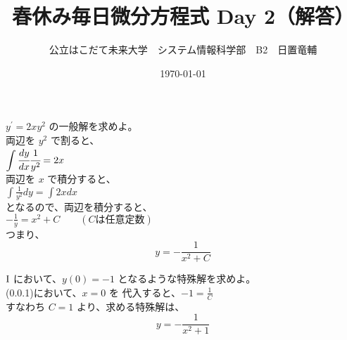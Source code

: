 \documentclass[dvipdfmx,uplatex]{jsarticle}
\title{春休み毎日微分方程式 Day 2（解答）}
\author{公立はこだて未来大学　システム情報科学部　B2　日置竜輔}
\date{\today}
\begin{document}
\begin{spacing}{1.6}
\maketitle

\begin{qparts}
    \qpart $ y ^ {\prime} = 2xy ^ 2 $ の一般解を求めよ。\\
    両辺を $ y ^ 2 $ で割ると、\\
    $ \displaystyle \int \cfrac{dy}{dx} \cfrac{1}{y ^ 2} = 2x $ \\
    両辺を $ x $ で積分すると、\\
    $ \displaystyle \int \frac{1}{y ^ 2}dy = \int 2xdx $ \\
    となるので、両辺を積分すると、\\
    $ \displaystyle -\frac{1}{y} = x ^ 2 + C \qquad (Cは任意定数) $ \\
    つまり、
    \begin{equation}
      y = -\frac{1}{x ^ 2 + C} \nonumber
    \end{equation}

    \qpart $\rm I $ において、$ y(0) = -1 $ となるような特殊解を求めよ。\\
    (0.0.1)において、$ x = 0 $ を 代入すると、$ \displaystyle -1 = \frac{1}{C}$ \\
    すなわち $ C = 1$ より、求める特殊解は、
    \begin{equation}
      y = -\frac{1}{x ^ 2 + 1} \nonumber
    \end{equation}
\end{qparts}
\end{spacing}
\end{document}
